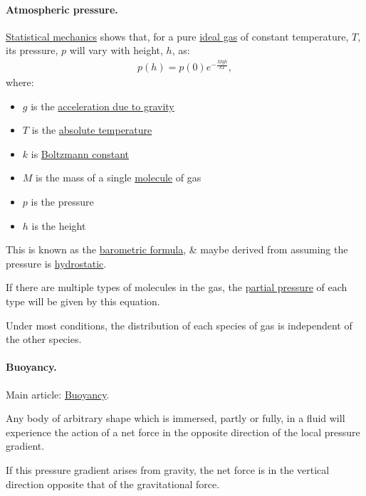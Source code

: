 \documentclass{article}
\begin{document}
\paragraph{Atmospheric pressure.} \href{https://en.wikipedia.org/wiki/Statistical_mechanics}{Statistical mechanics} shows that, for a pure \href{https://en.wikipedia.org/wiki/Ideal_gas}{ideal gas} of constant temperature, $T$, its pressure, $p$ will vary with height, $h$, as: 
\begin{align*}
	p(h) = p(0)e^{-\frac{Mgh}{kT}},
\end{align*}
where:
\begin{itemize}
	\item $g$ is the \href{https://en.wikipedia.org/wiki/Standard_gravity}{acceleration due to gravity}
	\item $T$ is the \href{https://en.wikipedia.org/wiki/Absolute_temperature}{absolute temperature}
	\item $k$ is \href{https://en.wikipedia.org/wiki/Boltzmann_constant}{Boltzmann constant}
	\item $M$ is the mass of a single \href{https://en.wikipedia.org/wiki/Molecule}{molecule} of gas
	\item $p$ is the pressure
	\item $h$ is the height
\end{itemize}
This is known as the \href{https://en.wikipedia.org/wiki/Barometric_formula}{barometric formula}, \& maybe derived from assuming the pressure is \href{https://en.wikipedia.org/wiki/Hydrostatic_pressure}{hydrostatic}.

%
If there are multiple types of molecules in the gas, the \href{https://en.wikipedia.org/wiki/Partial_pressure}{partial pressure} of each type will be given by this equation.

Under most conditions, the distribution of each species of gas is independent of the other species.

\paragraph{Buoyancy.} Main article: \href{https://en.wikipedia.org/wiki/Buoyancy}{Buoyancy}.

%
Any body of arbitrary shape which is immersed, partly or fully, in a fluid will experience the action of a net force in the opposite direction of the local pressure gradient.

If this pressure gradient arises from gravity, the net force is in the vertical direction opposite that of the gravitational force.
\end{document}
